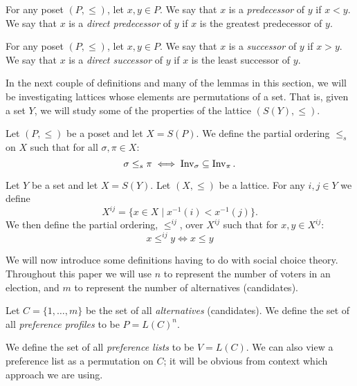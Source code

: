 	\begin{definition}
		For any poset $(P, \le)$, let $x,y \in P$. We say that $x$ is a \emph{predecessor} of $y$ if $x < y$. We say that $x$ is a \emph{direct predecessor} of $y$ if $x$ is the greatest predecessor of $y$.
	\end{definition}

	\begin{definition}
		For any poset $(P, \le)$, let $x,y \in P$. We say that $x$ is a \emph{successor} of $y$ if $x > y$. We say that $x$ is a \emph{direct successor} of $y$ if $x$ is the least successor of $y$.
	\end{definition}

	In the next couple of definitions and many of the lemmas in this section, we will be investigating lattices whose elements are permutations of a set. That is, given a set $Y$, we will study some of the properties of the lattice $(S(Y), \le)$.

	\begin{definition}[$\le_s$]
		\label{partial-order-s-definition}
		Let $(P, \le)$ be a poset and let $X = S(P)$. We define the partial ordering $\le_s$ on $X$ such that for all $\sigma, \pi \in X$:
		\[
			\sigma \le_s \pi \iff \operatorname{Inv}_{\sigma} \subseteq \operatorname{Inv}_{\pi}.
		\]
	\end{definition}

	\begin{definition}[$X^{ij}, \le^{ij}$]
		Let $Y$ be a set and let $X = S(Y)$. Let $(X, \le)$ be a lattice. For any $i,j \in Y$ we define
		\[
			X^{ij} = \{ x \in X \mid x^{-1}(i) < x^{-1}(j) \}.
		\]
		We then define the partial ordering, $\le^{ij}$, over $X^{ij}$ such that for $x, y \in X^{ij}$:
		\[
			x \le^{ij} y \iff x \le y
		\]
	\end{definition}

	We will now introduce some definitions having to do with social choice theory. Throughout this paper we will use $n$ to represent the number of voters in an election, and $m$ to represent the number of alternatives (candidates).

	\begin{definition}
		Let $C = \{1, \ldots, m\}$ be the set of all \emph{alternatives} (candidates). We define the set of all \emph{preference profiles} to be $P = L(C)^n$.
	\end{definition}

	\begin{definition}
		We define the set of all \emph{preference lists} to be $V = L(C)$. We can also view a preference list as a permutation on $C$; it will be obvious from context which approach we are using.
	\end{definition}

